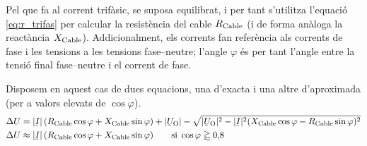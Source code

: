 Pel que fa al corrent trif\`{a}sic, se suposa equilibrat, i per tant s'utilitza l'equaci\'{o}
\eqref{eq:r_trifas} per calcular la resist\`{e}ncia del cable $R_\mathrm{Cable}$ (i de forma
an\`{a}loga la react\`{a}ncia $X_\mathrm{Cable}$). Addicionalment, els corrents fan refer\`{e}ncia als
corrents de fase i les tensions a les tensions fase--neutre; l'angle $\varphi$ \'{e}s per
tant l'angle entre la tensi\'{o} final fase--neutre i el corrent de fase.

Disposem en aquest cas de dues equacions, una d'exacta i una altre d'aproximada (per a valors elevats de $\cos \varphi$).
\begin{subequations}
\begin{align}
   \Delta U &= |\cmplx{I}| \,( R\ped{Cable} \cos \varphi + X\ped{Cable} \sin \varphi) + |\cmplx{U}\ped{O}| - \sqrt{|\cmplx{U}\ped{O}|^2 - |\cmplx{I}|^2 ( X\ped{Cable} \cos \varphi - R\ped{Cable} \sin \varphi )^2} \label{eq:cdt_trif_exact} \\
   \Delta U &\approx |\cmplx{I}| \,( R\ped{Cable} \cos \varphi + X\ped{Cable} \sin \varphi) \qquad \text{si} \; \cos \varphi \gtrapprox 0{,}8 \label{eq:cdt_trif_aprox}
\end{align}
\end{subequations}

